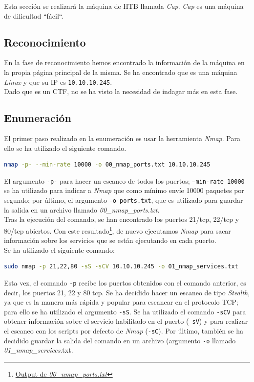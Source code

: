 Esta sección se realizará la máquina de \acrlong{HTB} llamada \textit{Cap}\cite{cap}. \textit{Cap} es una máquina de dificultad ``fácil``.

\subsection{Reconocimiento}
En la fase de reconocimiento hemos encontrado la información de la máquina en la propia página principal\cite{cap} de la misma. Se ha encontrado que es una máquina \textit{Linux} y que su IP es \texttt{10.10.10.245}.\\

Dado que es un \acrshort{CTF}, no se ha visto la necesidad de indagar más en esta fase.

\subsection{Enumeración}
El primer paso realizado en la enumeración es usar la herramienta \textit{Nmap}\cite{nmap}. Para ello se ha utilizado el siguiente comando.
\begin{lstlisting}[language=bash]
nmap -p- --min-rate 10000 -o 00_nmap_ports.txt 10.10.10.245
\end{lstlisting}
El argumento \texttt{-p-} para hacer un escaneo de todos los puertos; \texttt{--min-rate 10000} se ha utilizado para indicar a \textit{Nmap} que como mínimo envíe 10000 paquetes por segundo; por último, el argumento \texttt{-o ports.txt}, que es utilizado para guardar la salida en un archivo llamado \textit{00\_nmap\_ports.txt}.\\

Tras la ejecución del comando, se han encontrado los puertos 21/\acrshort{tcp}, 22/\acrshort{tcp} y 80/\acrshort{tcp} abiertos. Con este resultado\footnote{\href{https://github.com/VictorNS69/TFM/blob/main/machines/cap/00_nmap_ports.txt}{Output de \textit{00\_nmap\_ports.txt}}}, de nuevo ejecutamos \textit{Nmap} para sacar información sobre los servicios que se están ejecutando en cada puerto.\\

Se ha utilizado el siguiente comando:
\begin{lstlisting}[language=bash]
sudo nmap -p 21,22,80 -sS -sCV 10.10.10.245 -o 01_nmap_services.txt
\end{lstlisting}

Esta vez, el comando \texttt{-p} recibe los puertos obtenidos con el comando anterior, es decir, los puertos 21, 22 y 80 \acrshort{tcp}. Se ha decidido hacer un escaneo de tipo \textit{Stealth}, ya que es la manera más rápida y popular para escanear en el protocolo TCP; para ello se ha utilizado el argumento \texttt{-sS}. Se ha utilizado el comando \texttt{-sCV} para obtener información sobre el servicio habilitado en el puerto (\texttt{-sV}) y para realizar el escaneo con los scripts por defecto de \textit{Nmap} (\texttt{-sC}). Por último, también se ha decidido guardar la salida del comando en un archivo (argumento \texttt{-o} llamado \textit{01\_nmap\_services}.txt.\\

